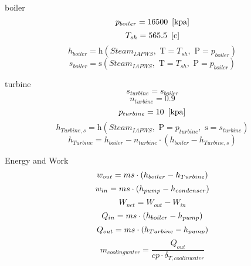 \documentclass[10pt,fleqn]{article}
\newcommand{\F}[1]{\mbox{$#1$}}
\newcommand{\V}[1]{\mbox{$ #1 $}}
\newcommand{\enthalpy}{\mathrm{h}}
\newcommand{\entropy}{\mathrm{s}}
\begin{document}
\vspace{0.04in}
\noindent
{\color{blue} \rm boiler}
\begin{equation}
\label{EES Eqn:14}
p_{boiler}=16500   \   \left[ \rm kpa \right] 
\end{equation}
{\color{blue} \rm}
\begin{equation}
\label{EES Eqn:15}
T_{sh} =565.5   \   \left[ \rm c \right] 
\end{equation}
{\color{blue} \rm}
\begin{equation}
\label{EES Eqn:16}
h_{boiler}=\enthalpy \left(\F{Steam}_{IAPWS},\mbox{\ T}=T_{sh},\mbox{\ P}=p_{boiler} \right)  
\end{equation}
\begin{equation}
\label{EES Eqn:17}
s_{boiler}=\entropy \left(\F{Steam}_{IAPWS},\mbox{\ T}=T_{sh},\mbox{\ P}=p_{boiler} \right)  
\end{equation}

\vspace{0.04in}
\noindent
{\color{blue} \rm turbine}
\begin{equation}
\label{EES Eqn:18}
s_{turbine}=s_{boiler} 
\end{equation}
\begin{equation}
\label{EES Eqn:19}
n_{turbine}=0.9 
\end{equation}
\begin{equation}
\label{EES Eqn:20}
p_{turbine}=10   \   \left[ \rm kpa \right] 
\end{equation}
{\color{blue} \rm}
\begin{equation}
\label{EES Eqn:21}
h_{Turbine,s}=\enthalpy \left(\F{Steam}_{IAPWS},\mbox{\ P}=p_{turbine},\mbox{\ s}=s_{turbine} \right)  
\end{equation}
\begin{equation}
\label{EES Eqn:22}
h_{Turbine}=h_{boiler}-n_{turbine}\cdot  \left( h_{boiler}-h_{Turbine,s} \right)  
\end{equation}

\vspace{0.04in}
\noindent
{\color{blue} \rm Energy and Work}
\begin{equation}
\label{EES Eqn:23}
w_{out}=\V{ms} \cdot  \left( h_{boiler}-h_{Turbine} \right)  
\end{equation}
\begin{equation}
\label{EES Eqn:24}
w_{in}=\V{ms} \cdot  \left( h_{pump}-h_{condenser} \right)  
\end{equation}
\begin{equation}
\label{EES Eqn:25}
W_{net} = W_{out}-W_{in} 
\end{equation}
\begin{equation}
\label{EES Eqn:26}
Q_{in}=\V{ms} \cdot  \left( h_{boiler}-h_{pump} \right)  
\end{equation}
\begin{equation}
\label{EES Eqn:27}
Q_{out}=\V{ms} \cdot  \left( h_{Turbine}-h_{pump} \right)  
\end{equation}
\begin{equation}
\label{EES Eqn:28}
m_{coolingwater}=\frac {Q_{out}}{ cp\cdot {\delta }_{T,coolinwater} } 
\end{equation}
\end{document}
